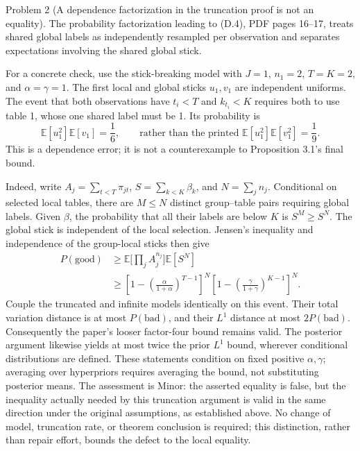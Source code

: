 \documentclass[10pt]{article}
\begin{document}
Problem 2 (A dependence factorization in the truncation proof is not an equality).  The probability factorization leading to (D.4), PDF pages 16–17, treats shared global labels as independently resampled per observation and separates expectations involving the shared global stick.\par
For a concrete check, use the stick-breaking model with \(J=1\), \(n_1=2\), \(T=K=2\), and \(\alpha=\gamma=1\). The first local and global sticks \(u_1,v_1\) are independent uniforms. The event that both observations have \(t_i<T\) and \(k_{t_i}<K\) requires both to use table 1, whose one shared label must be 1. Its probability is \[\mathbb E[u_1^2]\mathbb E[v_1]=\frac16,
 \qquad\text{rather than the printed }\mathbb E[u_1^2]\mathbb E[v_1^2]=\frac19.\] This is a dependence error; it is not a counterexample to Proposition 3.1’s final bound.\par
Indeed, write \(A_j=\sum_{t<T}\pi_{jt}\), \(S=\sum_{k<K}\beta_k\), and \(N=\sum_jn_j\). Conditional on selected local tables, there are \(M\leq N\) distinct group–table pairs requiring global labels. Given \(\beta\), the probability that all their labels are below \(K\) is \(S^M\geq S^N\). The global stick is independent of the local selection. Jensen’s inequality and independence of the group-local sticks then give \[\begin{aligned}
 P(\text{good})
 &\geq\mathbb E\Big[\prod_j A_j^{n_j}\Big]\mathbb E[S^N]\\
 &\geq\left[1-\left(\frac{\alpha}{1+\alpha}\right)^{T-1}\right]^N
       \left[1-\left(\frac{\gamma}{1+\gamma}\right)^{K-1}\right]^N.\end{aligned}\] Couple the truncated and infinite models identically on this event. Their total variation distance is at most \(P(\text{bad})\), and their \(L^1\) distance at most \(2P(\text{bad})\). Consequently the paper’s looser factor-four bound remains valid. The posterior argument likewise yields at most twice the prior \(L^1\) bound, wherever conditional distributions are defined. These statements condition on fixed positive \(\alpha,\gamma\); averaging over hyperpriors requires averaging the bound, not substituting posterior means. The assessment is Minor: the asserted equality is false, but the inequality actually needed by this truncation argument is valid in the same direction under the original assumptions, as established above. No change of model, truncation rate, or theorem conclusion is required; this distinction, rather than repair effort, bounds the defect to the local equality.\par
\end{document}
